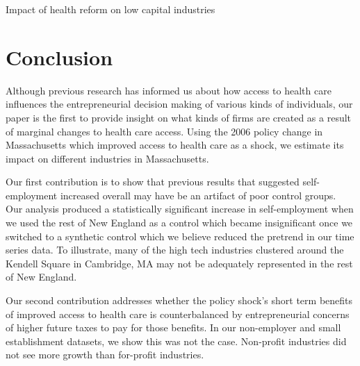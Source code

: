 \documentclass[12pt]{article}
\begin{document}
\begin{table}[H]
	\centering
	
	\caption{Impact of health reform on low capital industries}
	\label{tab:capital_ne_ext}
\end{table} 

\begin{comment}

\begin{table}[H]
	\centering
	
	\caption{Impact of health reform on low capital industries}
\end{table}

\end{comment}

\section{Conclusion}
\label{sec:conclude}

Although previous research has informed us about how access to health care influences the entrepreneurial decision making of various kinds of individuals, our paper is the first to provide insight on what kinds of firms are created as a result of marginal changes to health care access. Using the 2006 policy change in Massachusetts which improved access to health care as a shock, we estimate its impact on different industries in Massachusetts. 

Our first contribution is to show that previous results that suggested self-employment increased overall may have be an artifact of poor control groups. Our analysis produced a statistically significant increase in self-employment when we used the rest of New England as a control which became insignificant once we switched to a synthetic control which we believe reduced the pretrend in our time series data. To illustrate, many of the high tech industries clustered around the Kendell Square in Cambridge, MA may not be adequately represented in the rest of New England.

Our second contribution addresses whether the policy shock's short term benefits of improved access to health care is counterbalanced by entrepreneurial concerns of higher future taxes to pay for those benefits. In our non-employer and small establishment datasets, we show this was not the case. Non-profit industries did not see more growth than for-profit industries. 
\end{document}
